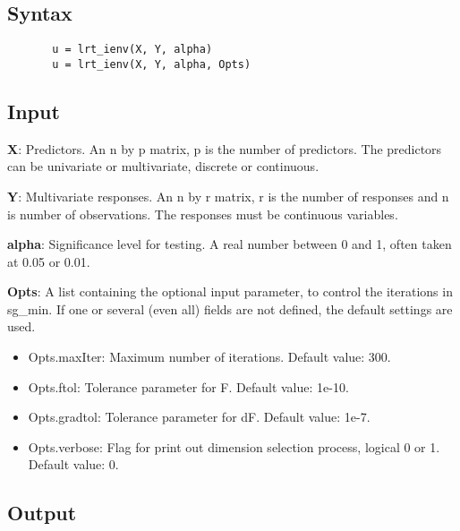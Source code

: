 \documentclass[a4paper,11pt,openany]{memoir}
\begin{document}
\subsection*{Syntax}


\begin{verbatim}       u = lrt_ienv(X, Y, alpha)
       u = lrt_ienv(X, Y, alpha, Opts)\end{verbatim}
    

\subsection*{Input}

\begin{par}
\textbf{X}: Predictors. An n by p matrix, p is the number of predictors. The predictors can be univariate or multivariate, discrete or continuous.
\end{par} \vspace{1em}
\begin{par}
\textbf{Y}: Multivariate responses. An n by r matrix, r is the number of responses and n is number of observations. The responses must be continuous variables.
\end{par} \vspace{1em}
\begin{par}
\textbf{alpha}: Significance level for testing.  A real number between 0 and 1, often taken at 0.05 or 0.01.
\end{par} \vspace{1em}
\begin{par}
\textbf{Opts}: A list containing the optional input parameter, to control the iterations in sg\_min. If one or several (even all) fields are not defined, the default settings are used.
\end{par} \vspace{1em}
\begin{itemize}
\setlength{\itemsep}{-1ex}
   \item Opts.maxIter: Maximum number of iterations.  Default value: 300.
   \item Opts.ftol: Tolerance parameter for F.  Default value: 1e-10.
   \item Opts.gradtol: Tolerance parameter for dF.  Default value: 1e-7.
   \item Opts.verbose: Flag for print out dimension selection process, logical 0 or 1. Default value: 0.
\end{itemize}


\subsection*{Output}
\end{document}
